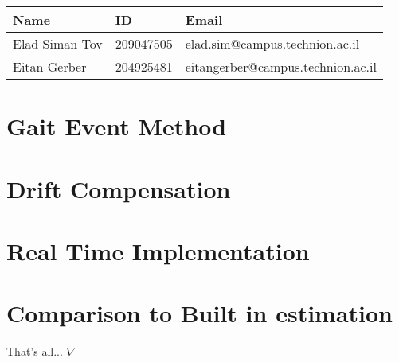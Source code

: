 \documentclass[10pt]{article}
\begin{document}
\begin{table}[h]
    \centering
    \begin{tabular}{l l l}
        \hline
        Name & ID & Email \\
        \hline
        Elad Siman Tov & 209047505 & elad.sim@campus.technion.ac.il \\
        \hline
        Eitan Gerber & 204925481 & eitangerber@campus.technion.ac.il \\
        \hline
    \end{tabular}
    \label{tab:personal_info}
\end{table}

\section{Gait Event Method}


\section{Drift Compensation}

\section{Real Time Implementation}


\section{Comparison to Built in estimation}



\noindent That's all... \hfill $\nabla$ 
 

\end{document}
